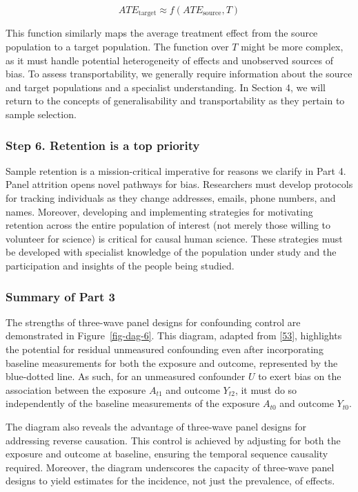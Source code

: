\documentclass[
  singlecolumn]{article}
\begin{document}
\[ATE_{\text{target}} \approx f(ATE_{\text{source}}, T)\]

This function similarly maps the average treatment effect from the
source population to a target population. The function over \(T\) might
be more complex, as it must handle potential heterogeneity of effects
and unobserved sources of bias. To assess transportability, we generally
require information about the source and target populations and a
specialist understanding. In Section 4, we will return to the concepts
of generalisability and transportability as they pertain to sample
selection.

\hypertarget{step-6.-retention-is-a-top-priority}{%
\subsubsection{Step 6. Retention is a top
priority}\label{step-6.-retention-is-a-top-priority}}

Sample retention is a mission-critical imperative for reasons we clarify
in Part 4. Panel attrition opens novel pathways for bias. Researchers
must develop protocols for tracking individuals as they change
addresses, emails, phone numbers, and names. Moreover, developing and
implementing strategies for motivating retention across the entire
population of interest (not merely those willing to volunteer for
science) is critical for causal human science. These strategies must be
developed with specialist knowledge of the population under study and
the participation and insights of the people being studied.

\hypertarget{summary-of-part-3}{%
\subsubsection{Summary of Part 3}\label{summary-of-part-3}}

The strengths of three-wave panel designs for confounding control are
demonstrated in Figure~\ref{fig-dag-6}. This diagram, adapted from
{[}\protect\hyperlink{ref-vanderweele2020}{53}{]}, highlights the
potential for residual unmeasured confounding even after incorporating
baseline measurements for both the exposure and outcome, represented by
the blue-dotted line. As such, for an unmeasured confounder \(U\) to
exert bias on the association between the exposure \(A_{t1}\) and
outcome \(Y_{t2}\), it must do so independently of the baseline
measurements of the exposure \(A_{t0}\) and outcome \(Y_{t0}\).

The diagram also reveals the advantage of three-wave panel designs for
addressing reverse causation. This control is achieved by adjusting for
both the exposure and outcome at baseline, ensuring the temporal
sequence causality required. Moreover, the diagram underscores the
capacity of three-wave panel designs to yield estimates for the
incidence, not just the prevalence, of effects.
\end{document}
